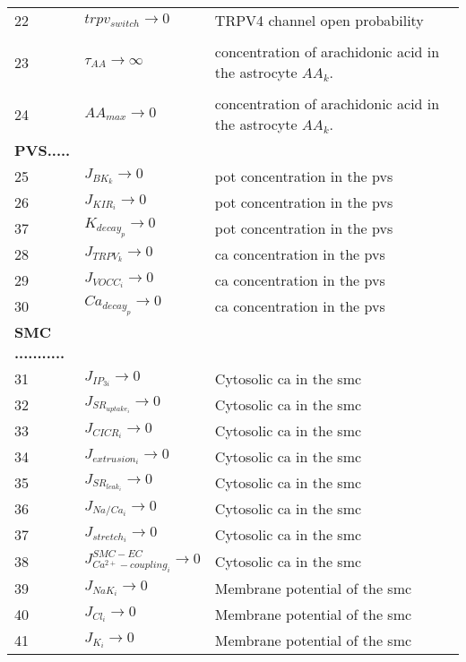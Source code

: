 \documentclass[]{article}
\newcommand{\pot}{\gls{pot}\xspace}
\newcommand{\ca}{\gls{ca}\xspace}
\begin{document}
\begin{longtable}[h!] { p{0.12\linewidth}  p{0.28\linewidth}     p{0.6\linewidth} }
22	& 	   $trpv_{switch}\rightarrow 0$ & TRPV4 channel open probability   \\
	& 	    & \\
23	& 	   $\tau_{AA}\rightarrow \infty$ & concentration of arachidonic acid in the astrocyte $AA_k$.\\
	& 	    & \\ 
24	& 	   $AA_{max}\rightarrow 0$ & concentration of arachidonic acid in the astrocyte $AA_k$. \\
 \textbf{PVS.....}& & \\
25  &    $J_{BK_k}\rightarrow 0$ & \pot concentration in the \gls{pvs}\\
26 &    $J_{KIR_i}\rightarrow 0$ & \pot concentration in the \gls{pvs}\\
37 &    $K_{decay_p} \rightarrow 0$ & \pot concentration in the \gls{pvs}\\
28 &    $J_{TRPV_k}\rightarrow 0$ &\ca concentration in the \gls{pvs}  \\
29 &    $J_{VOCC_i} \rightarrow 0$ & \ca concentration in the \gls{pvs} \\
30 &    $Ca_{decay_p} \rightarrow 0$ &  \ca concentration in the \gls{pvs}\\
 \textbf{SMC ...........} &      &\\
31 &    $ J_{IP_{3i}} \rightarrow 0$ & Cytosolic \ca in the \gls{smc}\\
32 &    $J_{SR_{uptake_{i}}} \rightarrow 0$ & Cytosolic \ca in the \gls{smc}\\
33 &    $ J_{CICR_{i}}\rightarrow 0$ & Cytosolic \ca in the \gls{smc} \\
34 &    $J_{extrusion_{i}} \rightarrow 0$ &Cytosolic \ca in the \gls{smc} \\
35 &    $  J_{SR_{leak_{i}}}\rightarrow 0$ & Cytosolic \ca in the \gls{smc}\\
36 &    $ J_{Na/Ca_{i}} \rightarrow 0$ & Cytosolic \ca in the \gls{smc}\\
37 &    $J_{stretch_{i}} \rightarrow 0$ & Cytosolic \ca in the \gls{smc}\\
38 &    $J_{Ca^{2+}-coupling_{i}}^{SMC-EC} \rightarrow 0$ &Cytosolic \ca in the \gls{smc} \\
39 &    $J_{NaK_{i}}\rightarrow 0$ & Membrane potential of the \gls{smc}\\
40 &    $J_{Cl_{i}}  \rightarrow 0$ & Membrane potential of the \gls{smc}\\
41 &    $ J_{K_{i}}\rightarrow 0$ & Membrane potential of the \gls{smc} \\

\end{longtable}
\end{document}
